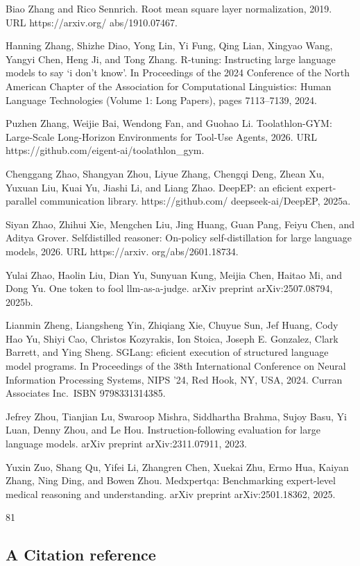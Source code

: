 \documentclass[
  10
]{article}
\begin{document}
Biao Zhang and Rico Sennrich. Root mean square layer normalization,
2019. URL https://arxiv.org/ abs/1910.07467.

Hanning Zhang, Shizhe Diao, Yong Lin, Yi Fung, Qing Lian, Xingyao Wang,
Yangyi Chen, Heng Ji, and Tong Zhang. R-tuning: Instructing large
language models to say `i don't know'. In Proceedings of the 2024
Conference of the North American Chapter of the Association for
Computational Linguistics: Human Language Technologies (Volume 1: Long
Papers), pages 7113--7139, 2024.

Puzhen Zhang, Weijie Bai, Wendong Fan, and Guohao Li. Toolathlon-GYM:
Large-Scale Long-Horizon Environments for Tool-Use Agents, 2026. URL
https://github.com/eigent-ai/toolathlon\_gym.

Chenggang Zhao, Shangyan Zhou, Liyue Zhang, Chengqi Deng, Zhean Xu,
Yuxuan Liu, Kuai Yu, Jiashi Li, and Liang Zhao. DeepEP: an eficient
expert-parallel communication library. https://github.com/
deepseek-ai/DeepEP, 2025a.

Siyan Zhao, Zhihui Xie, Mengchen Liu, Jing Huang, Guan Pang, Feiyu Chen,
and Aditya Grover. Selfdistilled reasoner: On-policy self-distillation
for large language models, 2026. URL https://arxiv. org/abs/2601.18734.

Yulai Zhao, Haolin Liu, Dian Yu, Sunyuan Kung, Meijia Chen, Haitao Mi,
and Dong Yu. One token to fool llm-as-a-judge. arXiv preprint
arXiv:2507.08794, 2025b.

Lianmin Zheng, Liangsheng Yin, Zhiqiang Xie, Chuyue Sun, Jef Huang, Cody
Hao Yu, Shiyi Cao, Christos Kozyrakis, Ion Stoica, Joseph E. Gonzalez,
Clark Barrett, and Ying Sheng. SGLang: eficient execution of structured
language model programs. In Proceedings of the 38th International
Conference on Neural Information Processing Systems, NIPS '24, Red Hook,
NY, USA, 2024. Curran Associates Inc.~ISBN 9798331314385.

Jefrey Zhou, Tianjian Lu, Swaroop Mishra, Siddhartha Brahma, Sujoy Basu,
Yi Luan, Denny Zhou, and Le Hou. Instruction-following evaluation for
large language models. arXiv preprint arXiv:2311.07911, 2023.

Yuxin Zuo, Shang Qu, Yifei Li, Zhangren Chen, Xuekai Zhu, Ermo Hua,
Kaiyan Zhang, Ning Ding, and Bowen Zhou. Medxpertqa: Benchmarking
expert-level medical reasoning and understanding. arXiv preprint
arXiv:2501.18362, 2025.

81

\subsection{A Citation reference}\label{a-citation-reference}
\end{document}
